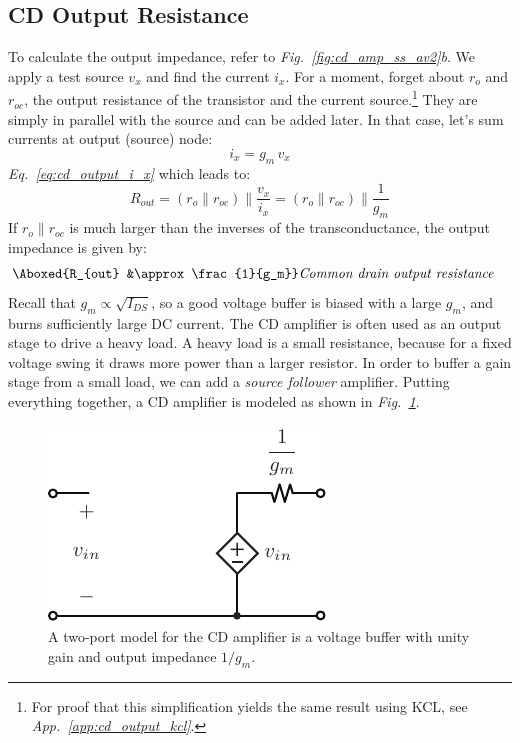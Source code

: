 \subsection{CD Output Resistance}
To calculate the output impedance, refer to \emph{Fig.~\ref{fig:cd_amp_ss_av2}b}.  We apply a test source $v_x$ and find the current $i_x$.  For a moment, forget about $r_o$ and $r_{oc}$, the output resistance of the transistor and the current source.\footnote{For proof that this simplification yields the same result using KCL, see \emph{App.~\ref{app:cd_output_kcl}}.}  They are simply in parallel with the source and can be added later.  In that case, let's sum currents at output (source) node:
    \begin{equation}
        i_x = g_m\,v_x
        \label{eq:cd_output_i_x}
    \end{equation}
\emph{Eq.~\ref{eq:cd_output_i_x}} which leads to:
    \begin{equation}
        R_{out} = \left(r_o \parallel r_{oc}\right) \parallel \frac{v_x}{i_x}
        = \boxed{\left(r_o \parallel r_{oc}\right) \parallel \frac{1}{g_m}}
        \label{eq:cd_output_resistance}
    \end{equation}
If $r_o \parallel r_{oc}$ is much larger than the inverses of the transconductance, the output impedance is given by:
    \begin{align}
        \Aboxed{R_{out} &\approx \frac{1}{g_m}} &\textit{Common drain output resistance}
        \label{eq:cd_output_resistance_simple}
    \end{align}
Recall that $g_m \propto \sqrt{I_{DS}}$, so a good voltage buffer is biased with a large $g_m$, and burns sufficiently large DC current.  The CD amplifier is often used as an output stage to drive a heavy load.  A heavy load is a small resistance, because for a fixed voltage swing it draws more power than a larger resistor.  In order to buffer a gain stage from a small load, we can add a \textit{source follower} amplifier.  Putting everything together, a CD amplifier is modeled as shown in \emph{Fig.~\ref{fig:cd_amp_model}}.  
\begin{figure}[H]
\centering
\includegraphics[scale=1.25]{cd_amp_model}
\caption{A two-port model for the CD amplifier is a voltage buffer with unity gain and output impedance $1/g_m$.}
\label{fig:cd_amp_model}
\end{figure}
